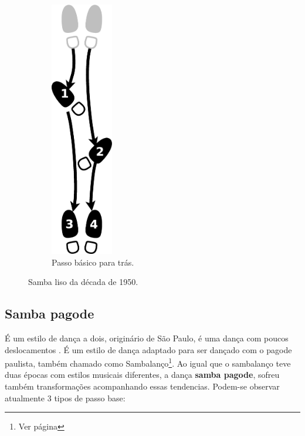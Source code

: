 \begin{figure}[h]
\begin{subfigure}[b]{0.3\textwidth}
        \label{fig:samba-liso-basico-frente}
    \end{subfigure}
    ~ %
    \begin{subfigure}[b]{0.3\textwidth}
        \centering
	\includegraphics[width=0.3\textwidth]{chapters/cap-historia-dancasamba/samba-liso-basico-tras.eps}
        \caption{Passo básico para trás.}
        \label{fig:samba-liso-basico-tras}
    \end{subfigure}
    \caption{Samba liso da década de 1950.}\label{fig:samba-liso-basico}
\end{figure}

\subsection{Samba pagode} 
É um estilo de dança a dois, originário de São Paulo, 
é uma dança com poucos deslocamentos \cite[pp. 134]{perna2002samba}.
É um estilo de dança adaptado para ser dançado com o pagode paulista,
também chamado como Sambalanço\footnote{Ver página \pageref{ref:sambalanco}}.
Ao igual que o sambalanço teve duas épocas com estilos musicais diferentes,
a dança \textbf{samba pagode}, sofreu também transformações acompanhando essas tendencias.
Podem-se observar atualmente 3 tipos de passo base: 

